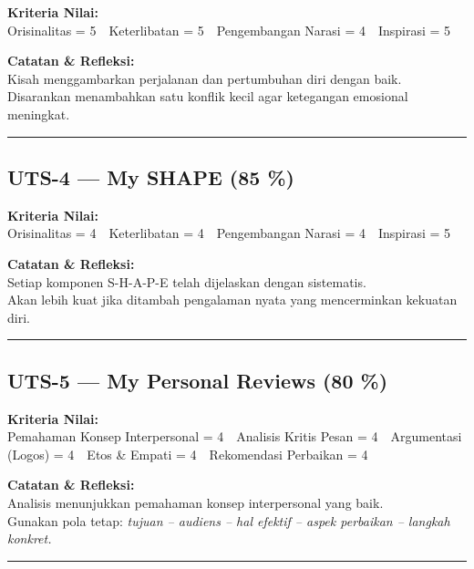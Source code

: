 \documentclass[
  letterpaper,
  DIV=11,
  numbers=noendperiod]{scrreprt}
\begin{document}
\textbf{Kriteria Nilai:}\\
Orisinalitas = 5 Keterlibatan = 5 Pengembangan Narasi = 4 Inspirasi = 5

\textbf{Catatan \& Refleksi:}\\
Kisah menggambarkan perjalanan dan pertumbuhan diri dengan baik.\\
Disarankan menambahkan satu konflik kecil agar ketegangan emosional
meningkat.

\begin{center}\rule{0.5\linewidth}{0.5pt}\end{center}

\subsection*{UTS-4 --- My SHAPE (85 \%)}\label{uts-4-my-shape-85}

\textbf{Kriteria Nilai:}\\
Orisinalitas = 4 Keterlibatan = 4 Pengembangan Narasi = 4 Inspirasi = 5

\textbf{Catatan \& Refleksi:}\\
Setiap komponen S-H-A-P-E telah dijelaskan dengan sistematis.\\
Akan lebih kuat jika ditambah pengalaman nyata yang mencerminkan
kekuatan diri.

\begin{center}\rule{0.5\linewidth}{0.5pt}\end{center}

\subsection*{UTS-5 --- My Personal Reviews (80
\%)}\label{uts-5-my-personal-reviews-80}

\textbf{Kriteria Nilai:}\\
Pemahaman Konsep Interpersonal = 4 Analisis Kritis Pesan = 4 Argumentasi
(Logos) = 4 Etos \& Empati = 4 Rekomendasi Perbaikan = 4

\textbf{Catatan \& Refleksi:}\\
Analisis menunjukkan pemahaman konsep interpersonal yang baik.\\
Gunakan pola tetap: \emph{tujuan -- audiens -- hal efektif -- aspek
perbaikan -- langkah konkret.}

\begin{center}\rule{0.5\linewidth}{0.5pt}\end{center}
\end{document}
